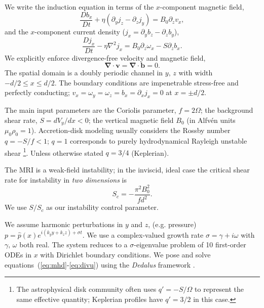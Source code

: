 \documentclass[aps,prl,reprint,superscriptaddress]{revtex4-1}
\newcommand{\SSC}{S/S_{c}}
\begin{document}
We write the induction equation in terms of the $x$-component magnetic field,
\begin{equation}\label{eq:Bx}
\frac{Db_{x}}{Dt}+\eta(\partial_{y}j_{z}-\partial_{z}j_{y})=B_{0}\partial_{z}v_{x},
\end{equation}
and the $x$-component current density ($j_{x}=\partial_{y}b_{z}-\partial_{z}b_{y}$),
\begin{equation}\label{eq:Jx}
\frac{Dj_{x}}{Dt}-\eta\nabla^{2}j_{x}=B_{0}\partial_{z}\omega_{x}-S\partial_{z}b_{x}.
\end{equation}
We explicitly enforce divergence-free velocity and magnetic field,
\begin{equation}\label{eq:divu}
 \boldsymbol{\nabla}\cdot\boldsymbol{v}=\boldsymbol{\nabla}\cdot\boldsymbol{b}=0.
\end{equation}
The spatial domain is a doubly periodic channel in $y,\,z$ with width $-d/2\le{x}\le d/2$.
The boundary conditions are impenetrable stress-free and perfectly conducting; $v_{x}=\omega_{y}=\omega_{z}=b_{x}=\partial_{x}j_{x}=0$ at $x=\pm{d/2}$. 

The main input parameters are the Coriolis parameter, $f=2 \Omega$; the background shear rate, $S=dV_{y}/dx<0$;  the vertical magnetic field $B_{0}$ (in Alfv\'{e}n units $\mu_{0}\rho_{0}=1$).
Accretion-disk modeling usually considers the Rossby number $q=-S/f<1$; $q=1$ corresponds to purely hydrodynamical Rayleigh unstable shear
\footnote{The astrophysical disk community often uses $q' = -S/\Omega$ to represent the same effective quantity; Keplerian profiles have $q' = 3/2$ in this case.}.
Unless otherwise stated $q=3/4$ (Keplerian).

The MRI is a weak-field instability; in the inviscid, ideal case the critical shear rate for instability in \textit{two dimensions} is
\begin{equation}\label{eq:Sc}
  S_{c}=-\frac{\pi^{2}B_{0}^2}{fd^2}.
\end{equation}
We use $\SSC$ as our instability control parameter. 

We assume harmonic perturbations in $y$ and $z$, (e.g. pressure) $p=\hat{p}(x)e^{i(k_{y}y+k_{z}z)+\sigma{t}}$. 
We use a complex-valued growth rate $\sigma=\gamma+i\omega$ with $\gamma,\,\omega$ both real. 
The system reduces to a $\sigma$-eigenvalue problem of 10 first-order ODEs in $x$ with Dirichlet boundary conditions.
We pose and solve equations~(\ref{eq:mhd}-\ref{eq:divu}) using the \emph{Dedalus} framework \citep{2019arXiv190510388B}.
\end{document}
